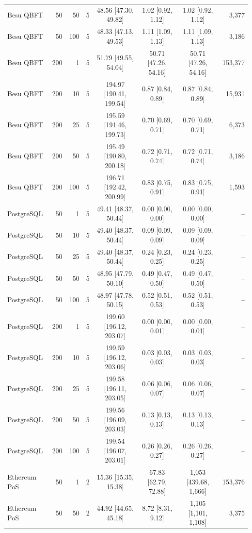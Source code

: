 \begin{table}[t]
{\begin{tabular}{lrrrcccr}
Besu QBFT & 50 & 50 & 5 & 48.56 [47.30, 49.82] & 1.02 [0.92, 1.12] & 1.02 [0.92, 1.12] & 3,377 \\
Besu QBFT & 50 & 100 & 5 & 48.33 [47.13, 49.53] & 1.11 [1.09, 1.13] & 1.11 [1.09, 1.13] & 3,186 \\
Besu QBFT & 200 & 1 & 5 & 51.79 [49.55, 54.04] & 50.71 [47.26, 54.16] & 50.71 [47.26, 54.16] & 153,377 \\
Besu QBFT & 200 & 10 & 5 & 194.97 [190.41, 199.54] & 0.87 [0.84, 0.89] & 0.87 [0.84, 0.89] & 15,931 \\
Besu QBFT & 200 & 25 & 5 & 195.59 [191.46, 199.73] & 0.70 [0.69, 0.71] & 0.70 [0.69, 0.71] & 6,373 \\
Besu QBFT & 200 & 50 & 5 & 195.49 [190.80, 200.18] & 0.72 [0.71, 0.74] & 0.72 [0.71, 0.74] & 3,186 \\
Besu QBFT & 200 & 100 & 5 & 196.71 [192.42, 200.99] & 0.83 [0.75, 0.91] & 0.83 [0.75, 0.91] & 1,593 \\
PostgreSQL & 50 & 1 & 5 & 49.41 [48.37, 50.44] & 0.00 [0.00, 0.00] & 0.00 [0.00, 0.00] & -- \\
PostgreSQL & 50 & 10 & 5 & 49.40 [48.37, 50.44] & 0.09 [0.09, 0.09] & 0.09 [0.09, 0.09] & -- \\
PostgreSQL & 50 & 25 & 5 & 49.40 [48.37, 50.44] & 0.24 [0.23, 0.25] & 0.24 [0.23, 0.25] & -- \\
PostgreSQL & 50 & 50 & 5 & 48.95 [47.79, 50.10] & 0.49 [0.47, 0.50] & 0.49 [0.47, 0.50] & -- \\
PostgreSQL & 50 & 100 & 5 & 48.97 [47.78, 50.15] & 0.52 [0.51, 0.53] & 0.52 [0.51, 0.53] & -- \\
PostgreSQL & 200 & 1 & 5 & 199.60 [196.12, 203.07] & 0.00 [0.00, 0.01] & 0.00 [0.00, 0.01] & -- \\
PostgreSQL & 200 & 10 & 5 & 199.59 [196.12, 203.06] & 0.03 [0.03, 0.03] & 0.03 [0.03, 0.03] & -- \\
PostgreSQL & 200 & 25 & 5 & 199.58 [196.11, 203.05] & 0.06 [0.06, 0.07] & 0.06 [0.06, 0.07] & -- \\
PostgreSQL & 200 & 50 & 5 & 199.56 [196.09, 203.03] & 0.13 [0.13, 0.13] & 0.13 [0.13, 0.13] & -- \\
PostgreSQL & 200 & 100 & 5 & 199.54 [196.07, 203.01] & 0.26 [0.26, 0.27] & 0.26 [0.26, 0.27] & -- \\
Ethereum PoS & 50 & 1 & 2 & 15.36 [15.35, 15.38] & 67.83 [62.79, 72.88] & 1,053 [439.68, 1,666] & 153,376 \\
Ethereum PoS & 50 & 50 & 2 & 44.92 [44.65, 45.18] & 8.72 [8.31, 9.12] & 1,105 [1,101, 1,108] & 3,375 \\
\bottomrule
\end{tabular}}
\end{table}
